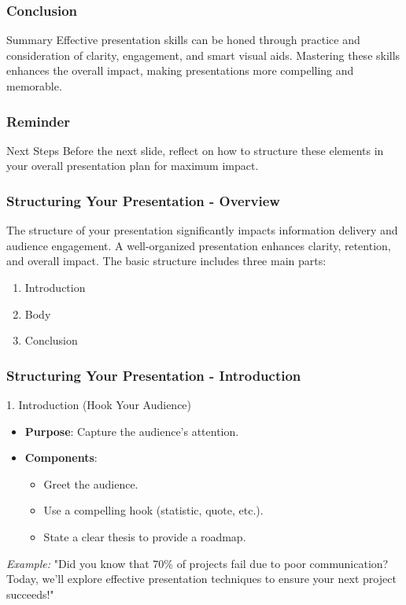 \documentclass{beamer}
\begin{document}
\begin{frame}[fragile]
    \frametitle{Conclusion}
    \begin{block}{Summary}
        Effective presentation skills can be honed through practice and consideration of clarity, engagement, and smart visual aids. Mastering these skills enhances the overall impact, making presentations more compelling and memorable.
    \end{block}
\end{frame}

\begin{frame}[fragile]
    \frametitle{Reminder}
    \begin{block}{Next Steps}
        Before the next slide, reflect on how to structure these elements in your overall presentation plan for maximum impact.
    \end{block}
\end{frame}

\begin{frame}[fragile]
    \frametitle{Structuring Your Presentation - Overview}
    The structure of your presentation significantly impacts information delivery and audience engagement. 
    A well-organized presentation enhances clarity, retention, and overall impact. 
    The basic structure includes three main parts:
    \begin{enumerate}
        \item Introduction
        \item Body
        \item Conclusion
    \end{enumerate}
\end{frame}

\begin{frame}[fragile]
    \frametitle{Structuring Your Presentation - Introduction}
    \begin{block}{1. Introduction (Hook Your Audience)}
        \begin{itemize}
            \item \textbf{Purpose}: Capture the audience's attention.
            \item \textbf{Components}:
            \begin{itemize}
                \item Greet the audience.
                \item Use a compelling hook (statistic, quote, etc.).
                \item State a clear thesis to provide a roadmap.
            \end{itemize}
        \end{itemize}
    \end{block}
    \textit{Example:} "Did you know that 70\% of projects fail due to poor communication? Today, we’ll explore effective presentation techniques to ensure your next project succeeds!"
\end{frame}
\end{document}
